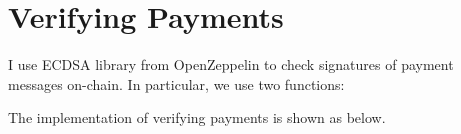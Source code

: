 \section{Verifying Payments}\label{sec:verifying-payments}
I use ECDSA library from OpenZeppelin to check signatures of payment messages on-chain.
In particular, we use two functions:

The implementation of verifying payments is shown as below.
